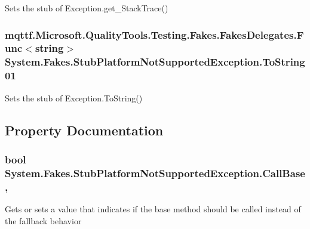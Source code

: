 Sets the stub of Exception.\-get\-\_\-\-Stack\-Trace()

\hypertarget{class_system_1_1_fakes_1_1_stub_platform_not_supported_exception_a038464e440b5919e1bd46d654d42c83c}{
\subsubsection[{To\-String01}]{\setlength{\rightskip}{0pt plus 5cm}mqttf.\-Microsoft.\-Quality\-Tools.\-Testing.\-Fakes.\-Fakes\-Delegates.\-Func$<$string$>$ System.\-Fakes.\-Stub\-Platform\-Not\-Supported\-Exception.\-To\-String01}}\label{class_system_1_1_fakes_1_1_stub_platform_not_supported_exception_a038464e440b5919e1bd46d654d42c83c}


Sets the stub of Exception.\-To\-String()



\subsection{Property Documentation}
\hypertarget{class_system_1_1_fakes_1_1_stub_platform_not_supported_exception_a54b8e447ef15772b600382d31b6be14a}{
\subsubsection[{Call\-Base}]{\setlength{\rightskip}{0pt plus 5cm}bool System.\-Fakes.\-Stub\-Platform\-Not\-Supported\-Exception.\-Call\-Base\hspace{0.3cm}{\ttfamily [get]}, {\ttfamily [set]}}}\label{class_system_1_1_fakes_1_1_stub_platform_not_supported_exception_a54b8e447ef15772b600382d31b6be14a}


Gets or sets a value that indicates if the base method should be called instead of the fallback behavior

